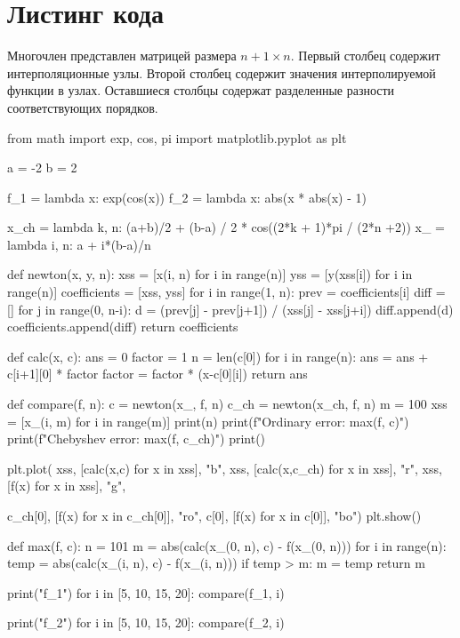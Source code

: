 \documentclass{article}
\begin{document}
\section*{Листинг кода}
Многочлен представлен матрицей размера $n+1 \times n$. Первый столбец содержит интерполяционные узлы.
Второй столбец содержит значения интерполируемой функции в узлах. Оставшиеся столбцы содержат разделенные разности соответствующих порядков.
\begin{python}
from math import exp, cos, pi
import matplotlib.pyplot as plt

a = -2
b =  2

f_1 = lambda x: exp(cos(x))
f_2 = lambda x: abs(x * abs(x) - 1)

x_ch = lambda k, n: (a+b)/2  + (b-a) / 2 * cos((2*k + 1)*pi / (2*n +2))
x_ = lambda i, n: a + i*(b-a)/n

def newton(x, y, n):
    xss = [x(i, n) for i in range(n)]
    yss = [y(xss[i]) for i in range(n)]
    coefficients = [xss, yss]
    for i in range(1, n):
        prev = coefficients[i]
        diff = []
        for j in range(0, n-i):
            d = (prev[j] - prev[j+1]) / (xss[j] - xss[j+i])
            diff.append(d)
        coefficients.append(diff)
    return coefficients

def calc(x, c):
    ans = 0
    factor = 1
    n = len(c[0])
    for i in range(n):
        ans = ans + c[i+1][0] * factor
        factor = factor * (x-c[0][i])
    return ans

def compare(f, n):
    c = newton(x_, f, n)
    c_ch = newton(x_ch, f, n)
    m = 100
    xss = [x_(i, m) for i in range(m)]
    print(n)
    print(f"Ordinary error: {max(f, c)}")
    print(f"Chebyshev error: {max(f, c_ch)}")
    print()

    plt.plot(
            xss, [calc(x,c) for x in xss], "b",
            xss, [calc(x,c_ch) for x in xss],  "r",
            xss, [f(x) for x in xss], "g",

            c_ch[0], [f(x) for x in c_ch[0]], "ro",
            c[0], [f(x) for x in c[0]], "bo")
    plt.show()

def max(f, c):
    n = 101
    m = abs(calc(x_(0, n), c)  - f(x_(0, n)))
    for i in range(n):
        temp = abs(calc(x_(i, n), c)  - f(x_(i, n)))
        if temp > m:
            m = temp
    return m

print("f_1")
for i in [5, 10, 15, 20]:
    compare(f_1, i)

print("f_2")
for i in [5, 10, 15, 20]:
    compare(f_2, i)
    

\end{python}
\end{document}
